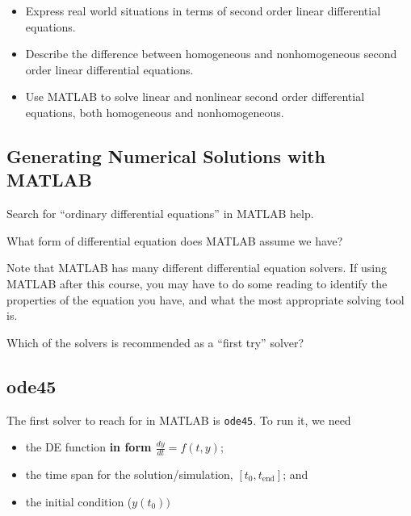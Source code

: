 


\newcommand{\Fe}{ F_{\mbox{ext}} }
\newcommand{\Fg}{ F_{\mbox{grav}} }


\setfont
\pagestyle{fancy}
\renewcommand{\Week}{8 }
\renewcommand{\WeekTitle}{\WeekTitleEight }

\fancyhead[LE,RO]{Week \Week}  %
\fancyfoot{}
\sectionbox{Week \#\Week: \WeekTitle}

\vspace{5mm}
\goals
\begin{itemize}
\item Express real world situations in terms of second order linear
  differential equations.
\item Describe the difference between homogeneous and nonhomogeneous
  second order linear differential equations.
\item Use MATLAB to solve linear and nonlinear second order
  differential equations, both homogeneous and nonhomogeneous.
\end{itemize}
\vspace{5mm}

\newpage

\subsection*{Generating Numerical Solutions with MATLAB}

\problem Search for ``ordinary differential equations'' in MATLAB help.  \vsc
\vsc

What form of differential equation does MATLAB assume we have?

\vsc
\vsc


\newpage

Note that MATLAB has many different differential equation solvers. If
using MATLAB after this course, you may have to do some reading to
identify the properties of the equation you have, and what the most
appropriate solving tool is.

\problem Which of the solvers is recommended as a ``first try''
solver?

\vsc
\vsc

\newpage

\subsection*{ode45}
The first solver to reach for in MATLAB is \verb#ode45#.  To run it, we need
\begin{itemize} 
\item the DE function {\bf in form $\displaystyle \frac{dy}{dt} = f(t, y)$};
\vfill
\item the time span for the solution/simulation, $[t_0, t_{\mbox{end}}]$; and
\vfill
\item the initial condition ($y(t_0))$
\vfill
\end{itemize}

